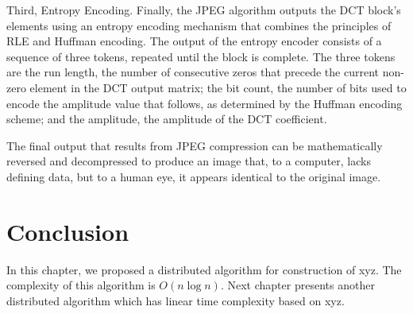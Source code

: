 Third, Entropy Encoding. Finally, the JPEG algorithm outputs the DCT block's elements using an entropy encoding mechanism that combines the principles of RLE and Huffman encoding. The output of the entropy encoder consists of a sequence of three tokens, repeated until the block is complete. The three tokens are the run length, the number of consecutive zeros that precede the current non-zero element in the DCT output matrix; the bit count, the number of bits used to encode the amplitude value that follows, as determined by the Huffman encoding scheme; and the amplitude, the amplitude of the DCT coefficient.

The final output that results from JPEG compression can be mathematically reversed and decompressed to produce an image that, to a computer, lacks defining data, but to a human eye, it appears identical to the original image.

\section{Conclusion}
In this chapter, we proposed a distributed algorithm
for construction of xyz.
The complexity of this algorithm is $O(n \log n)$.
Next chapter presents
another distributed algorithm which has linear time 
complexity based on xyz.

